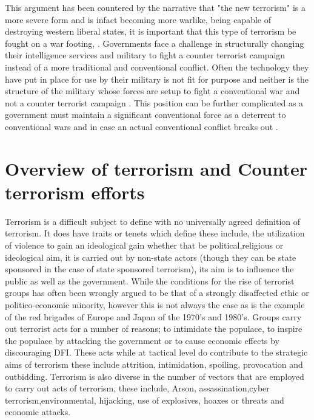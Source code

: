 This argument has been countered by the narrative that "the new terrorism" is a more severe form and is infact becoming more warlike, being capable of destroying western liberal states, it is important that this type of terrorism be fought on a war footing, \citep{bobbitt2008terror}.
Governments face a challenge in structurally changing their intelligence services and military to fight a counter terrorist campaign instead of a more traditional and conventional conflict. Often the technology they have put in place for use by their military is not fit for purpose and neither is the structure of the military whose forces are setup to fight a conventional war and not a counter terrorist campaign \citep{gazette1989changing}. This position can be further complicated as a government must maintain a significant conventional force as a deterrent to conventional wars and in case an actual conventional conflict breaks out \citep{gates2009balanced}.


\section{Overview of terrorism and Counter terrorism efforts}
Terrorism is a difficult subject to define with no universally agreed definition of terrorism. It does have traits or tenets which define these include, the utilization of violence to  gain  an ideological gain whether that be political,religious or ideological aim, it is carried out by non-state actors (though they can be state sponsored in the case of state sponsored terrorism), its aim is to influence the public as well as the government. While the conditions for the rise of terrorist groups has often been wrongly argued to be that of a strongly disaffected ethic or politico-economic minority, however this is not always the case as is the example of the red brigades of Europe and Japan of the 1970's and 1980's. Groups carry out terrorist acts for a number of reasons; to intimidate the populace, to inspire the populace by attacking the government or to cause economic effects by discouraging DFI. These acts while at tactical level do contribute to the strategic aims of terrorism these include attrition, intimidation, spoiling, provocation and outbidding.
Terrorism is also diverse in the number of vectors that are employed to carry out acts of terrorism, these include, Arson, assassination,cyber terrorism,environmental, hijacking, use of explosives, hoaxes or threats and economic attacks.

